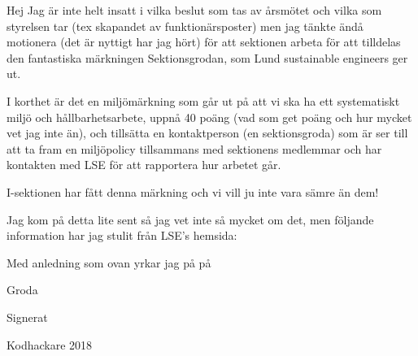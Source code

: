 \documentclass[../_main/handlingar.tex]{subfiles}
\begin{document}
Hej
Jag är inte helt insatt i vilka beslut som tas av årsmötet och vilka som styrelsen tar (tex skapandet av funktionärsposter) men jag tänkte ändå motionera (det är nyttigt har jag hört) för att sektionen arbeta för att tilldelas den fantastiska märkningen Sektionsgrodan, som Lund sustainable engineers ger ut.

I korthet är det en miljömärkning som går ut på att vi ska ha ett systematiskt miljö och hållbarhetsarbete, uppnå 40 poäng (vad som get poäng och hur mycket vet jag inte än), och tillsätta en kontaktperson (en sektionsgroda)  som är ser till att ta fram en miljöpolicy tillsammans med sektionens medlemmar och har kontakten med LSE för att rapportera hur arbetet går. 

I-sektionen har fått denna märkning och vi vill ju inte vara sämre än dem! 

Jag kom på detta lite sent så jag vet inte så mycket om det, men följande information har jag stulit från LSE's hemsida: 


Med anledning som ovan yrkar jag på på
\begin{attsatser}
\att Groda
\end{attsatser}
\begin{signatures}{2}
    Signerat
    \signature{Hannes Byden}{Kodhackare 2018}
\end{signatures}
\end{document}
